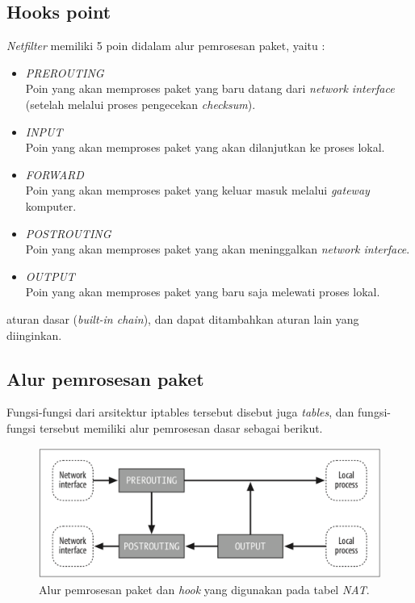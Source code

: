 \subsection{Hooks point}
\textit{Netfilter} memiliki 5 poin didalam alur pemrosesan paket, yaitu :
\begin{itemize}
	\item \textit{PREROUTING}\\
	Poin yang akan memproses paket yang baru datang dari \textit{network interface} (setelah melalui proses pengecekan \textit{checksum}).
	\item \textit{INPUT}\\
	Poin yang akan memproses paket yang akan dilanjutkan ke proses lokal.
	\item \textit{FORWARD}\\
	Poin yang akan memproses paket yang keluar masuk melalui \textit{gateway} komputer.
	\item \textit{POSTROUTING}\\
	Poin yang akan memproses paket yang akan meninggalkan \textit{network interface}.
	\item \textit{OUTPUT}\\
	Poin yang akan memproses paket yang baru saja melewati proses lokal.
\end{itemize}
aturan dasar (\textit{built-in chain}), dan dapat ditambahkan aturan lain yang diinginkan.

\subsection{Alur pemrosesan paket}
Fungsi-fungsi dari arsitektur iptables tersebut disebut juga \textit{tables}, dan fungsi-fungsi tersebut memiliki alur pemrosesan dasar sebagai berikut.\\
\begin{figure}[H]
	\centering
	\includegraphics[width=\textwidth]{resources/nat_table.png}
	\caption{Alur pemrosesan paket dan \textit{hook} yang digunakan pada tabel \textit{NAT}.}
	\label{fig:packetflow_NAT}
\end{figure}


